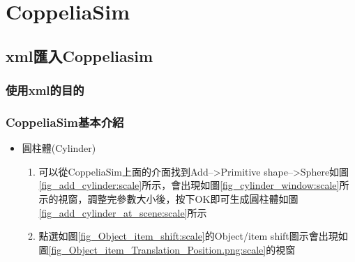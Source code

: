\documentclass[14pt,a4paper]{report}  %
\newcommand{\fourteen}{\fontsize{14pt}{\baselineskip}\selectfont}%
\begin{document}
{\begin{enumerate}
	\end{enumerate}
    	
    	\chapter{CoppeliaSim}
      \section{xml匯入Coppeliasim}
      \subsection{使用xml的目的}
      {\begin{flushleft}
      \quad \quad \fourteen {在CoppeliaSim4.1的版本可以使用xml檔自動匯入stl的零件檔，並且可以從中去設定物體的大小、重量、從屬關係....等等的參數都可以用xml檔來做調整，目的是打算在CoppeliaSim做到直接匯入就能直接完成所有的流程，不過因為技術上的問題，我們使用半自動的方式來完成腳踏車避震系統的動態模擬。}
      \end{flushleft}
      \subsection{CoppeliaSim基本介紹}
      {\begin{flushleft}
      \quad \quad \fourteen {在CoppeliaSim裡有內建的物體(shape)和馬達(joint)，其中我們比較常用到的是立方體(Cuboid)和旋轉接頭馬達(Revolute joint)，以下我們會對這2種物件進行介紹。}
      \end{flushleft}
      \begin{itemize}
      \item 圓柱體(Cylinder)
      	\begin{enumerate}
      	\item{可以從CoppeliaSim上面的介面找到Add-->Primitive shape-->Sphere如圖\ref{fig_add_cylinder:scale}所示，會出現如圖\ref{fig_cylinder_window:scale}所示的視窗，調整完參數大小後，按下OK即可生成圓柱體如圖\ref{fig_add_cylinder_at_scene:scale}所示}
      \item{點選如圖\ref{fig_Object_item_shift:scale}的Object/item shift圖示會出現如圖\ref{fig_Object_item_Translation_Position.png:scale}的視窗}\\\\\\\\




\end{enumerate}
\end{itemize}}}}
\end{document}
